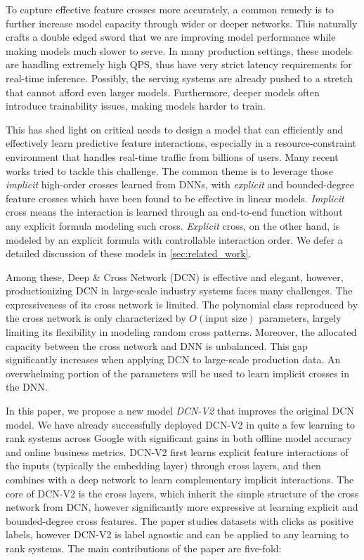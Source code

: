 \documentclass[sigconf]{acmart}
\begin{document}
To capture effective feature crosses more accurately, a common remedy is to further increase model capacity through wider or deeper networks. This naturally crafts a double edged sword that we are improving model performance while making models much slower to serve. In many production settings, these models are handling extremely high QPS, thus have very strict latency requirements for real-time inference. Possibly, the serving systems are already pushed to a stretch that cannot afford even larger models. Furthermore, deeper models often introduce trainability issues, making models harder to train.

This has shed light on critical needs to design a model that can efficiently and effectively learn predictive feature interactions, especially in a resource-constraint environment that handles real-time traffic from billions of users. Many recent works \cite{wang2017deep, cheng2016wide, guo2017deepfm, beutel2018latent, qu2016product, lian2018xdeepfm, song2019autoint, naumov2019deep} tried to tackle this challenge. The common theme is to leverage those \emph{implicit} high-order crosses learned from DNNs, with \emph{explicit} and bounded-degree feature crosses which have been found to be effective in linear models. \emph{Implicit} cross means the interaction is learned through an end-to-end function without any explicit formula modeling such cross. \emph{Explicit} cross, on the other hand, is modeled by an explicit formula with controllable interaction order. We defer a detailed discussion of these models in \autoref{sec:related_work}.

Among these, Deep \& Cross Network (DCN) \cite{wang2017deep} is effective and elegant, however, productionizing DCN in large-scale industry systems faces many challenges. The expressiveness of its cross network is limited. The polynomial class reproduced by the cross network is only characterized by $O(\text{input size})$ parameters, largely limiting its flexibility in modeling random cross patterns. 
Moreover, the allocated capacity between the cross network and DNN is unbalanced. This gap significantly increases when applying DCN to large-scale production data. An overwhelming portion of the parameters will be used to learn implicit crosses in the DNN.


In this paper, we propose a new model \emph{{DCN-V2}} that improves the original DCN model. We have already successfully deployed {DCN-V2} in quite a few learning to rank systems across Google with significant gains in both offline model accuracy and online business metrics. {DCN-V2} first learns explicit feature interactions of the inputs (typically the embedding layer) through cross layers, and then combines with a deep network to learn complementary implicit interactions. The core of {DCN-V2} is the cross layers, which inherit the simple structure of the cross network from DCN, however significantly more expressive at learning explicit and bounded-degree cross features. The paper studies datasets with clicks as positive labels, however {DCN-V2} is label agnostic and can be applied to any learning to rank systems.
The main contributions of the paper are five-fold:
\end{document}
